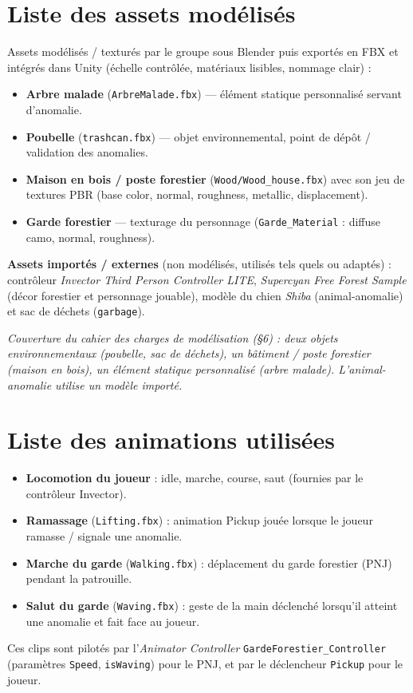 \documentclass[11pt,a4paper]{article}
\begin{document}
\section{Liste des assets modélisés}
Assets modélisés / texturés par le groupe sous Blender puis exportés en FBX et
intégrés dans Unity (échelle contrôlée, matériaux lisibles, nommage clair) :
\begin{itemize}
  \item \textbf{Arbre malade} (\texttt{ArbreMalade.fbx}) --- élément statique
        personnalisé servant d'anomalie.
  \item \textbf{Poubelle} (\texttt{trashcan.fbx}) --- objet environnemental, point
        de dépôt / validation des anomalies.
  \item \textbf{Maison en bois / poste forestier} (\texttt{Wood/Wood\_house.fbx})
        avec son jeu de textures PBR (base color, normal, roughness, metallic,
        displacement).
  \item \textbf{Garde forestier} --- texturage du personnage
        (\texttt{Garde\_Material} : diffuse camo, normal, roughness).
\end{itemize}

\noindent\textbf{Assets importés / externes} (non modélisés, utilisés tels quels
ou adaptés) : contrôleur \emph{Invector Third Person Controller LITE},
\emph{Supercyan Free Forest Sample} (décor forestier et personnage jouable),
modèle du chien \emph{Shiba} (animal-anomalie) et sac de déchets (\texttt{garbage}).

\noindent\textit{Couverture du cahier des charges de modélisation (§6) : deux objets
environnementaux (poubelle, sac de déchets), un bâtiment / poste forestier (maison
en bois), un élément statique personnalisé (arbre malade). L'animal-anomalie utilise
un modèle importé.}

\section{Liste des animations utilisées}
\begin{itemize}
  \item \textbf{Locomotion du joueur} : idle, marche, course, saut (fournies par
        le contrôleur Invector).
  \item \textbf{Ramassage} (\texttt{Lifting.fbx}) : animation \og Pickup \fg{}
        jouée lorsque le joueur ramasse / signale une anomalie.
  \item \textbf{Marche du garde} (\texttt{Walking.fbx}) : déplacement du garde
        forestier (PNJ) pendant la patrouille.
  \item \textbf{Salut du garde} (\texttt{Waving.fbx}) : geste de la main déclenché
        lorsqu'il atteint une anomalie et fait face au joueur.
\end{itemize}
Ces clips sont pilotés par l'\emph{Animator Controller}
\texttt{GardeForestier\_Controller} (paramètres \texttt{Speed}, \texttt{isWaving})
pour le PNJ, et par le déclencheur \texttt{Pickup} pour le joueur.
\end{document}
